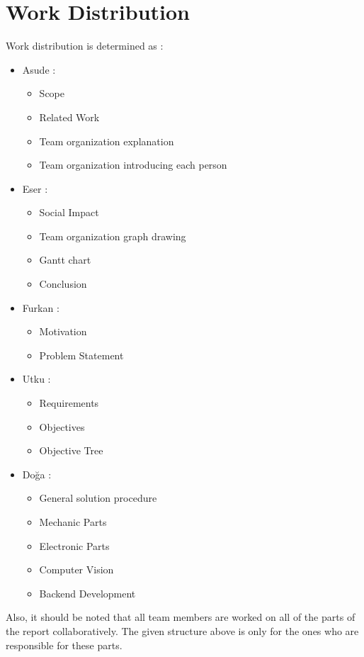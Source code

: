 \section{Work Distribution}
\label{sec:workDistribution}
Work distribution is determined as :
\begin{itemize}
    \item Asude :
    \begin{itemize}
        \item Scope
        \item Related Work
        \item Team organization explanation
        \item Team organization introducing each person
    \end{itemize}
    
    \item Eser :
    \begin{itemize}
        \item Social Impact
        \item Team organization graph drawing
        \item Gantt chart
        \item Conclusion
    \end{itemize}
    
    \item Furkan : 
    \begin{itemize}
        \item Motivation
        \item Problem Statement
    \end{itemize}

    \item Utku :
    \begin{itemize}
        \item Requirements
        \item Objectives
        \item Objective Tree
    \end{itemize}
    
    \item Doğa : 
    \begin{itemize}
        \item General solution procedure
        \item Mechanic Parts
        \item Electronic Parts
        \item Computer Vision
        \item Backend Development
    \end{itemize}
\end{itemize}

Also, it should be noted that all team members are worked on all of the parts of the report collaboratively. The given structure above is only for the ones who are responsible for these parts.

